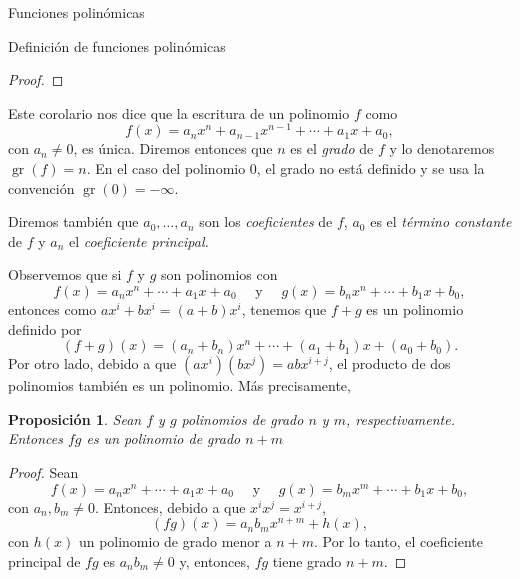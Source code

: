 \documentclass[a4paper,12pt,twoside,spanish]{amsbook}
\newtheorem{proposicion}[teorema]{Proposici\'on}
\theoremstyle{definition}
\theoremstyle{remark}
\begin{document}
\begin{chapter}{Funciones polinómicas}
\begin{section}{Definición de funciones polinómicas}
\begin{proof}
		
	\end{proof}

	Este corolario nos dice que la escritura de un polinomio $f$ como 
	\begin{equation*}
	f(x) = a_nx^n + a_{n-1}x^{n-1}+\cdots + a_1x +a_0,
	\end{equation*}
	con $a_n \ne 0$, es única. Diremos entonces que $n$ es el  \textit{grado} de $f$ y lo denotaremos $\operatorname{gr}(f)=n$. En  el caso del polinomio 0, el grado no está definido y se usa la convención $\operatorname{gr}(0)=-\infty$. 
	
	Diremos también que  $a_0,\ldots,a_n$ son los \textit{coeficientes} de $f$, $a_0$ es el \textit{término constante} de $f$ y $a_n$  el \textit{coeficiente principal.} 

	Observemos que si $f$ y $g$ son polinomios con   
	\begin{equation*}
	f(x) = a_nx^n + \cdots + a_1x +a_0 \quad\text{ y } \quad g(x) = b_nx^n +\cdots + b_1x +b_0,
	\end{equation*}
	entonces como $ax^i + b x^i = (a+b)x^i$, tenemos que $f+g$ es un polinomio definido por 
	\begin{equation*}
	(f + g)(x) = (a_n+b_n)x^n + \cdots + (a_1+b_1)x +(a_0+b_0).
	\end{equation*}
	Por otro  lado,  debido  a que $(ax^i)(bx^j) = abx^{i+j}$, el producto de dos polinomios también es un polinomio. Más precisamente,
	
	\begin{proposicion}
		Sean $f$ y $g$ polinomios de grado $n$ y $m$,  respectivamente. Entonces $fg$ es un  polinomio de grado $n+m$
	\end{proposicion}
	\begin{proof}
		Sean 
		\begin{equation*}
		f(x) = a_nx^n + \cdots + a_1x +a_0 \quad\text{ y } \quad g(x) = b_mx^m +\cdots + b_1x +b_0,
		\end{equation*}
		con $a_n, b_m \ne 0$. Entonces, debido a que $x^ix^j = x^{i+j}$, 
		\begin{equation}
			(fg)(x) = a_nb_m x^{n+m} + h(x),
 		\end{equation}
		con $h(x)$ un polinomio de grado menor a $n+m$. Por lo tanto, el coeficiente principal de $fg$ es $a_nb_m \ne 0$ y,  entonces, $fg$ tiene grado $n+m$.
	\end{proof}

	
		

\end{section}
\end{chapter}
\end{document}
